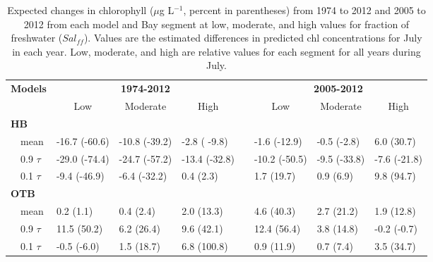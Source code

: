 \documentclass{svjour3}\usepackage[]{graphicx}\usepackage[]{color}
\newcommand{\mugl}{$\mu$g L$^{-1}$}
\begin{document}
%
\begin{table}[!tbp]
\caption{Expected changes in chlorophyll (\mugl, percent in parentheses) from 1974 to 2012 and 2005 to 2012 from each model and Bay segment at low, moderate, and high values for fraction of freshwater ($Sal_{ff}$).  Values are the estimated differences in predicted \ac{chl} concentrations for July in each year.  Low, moderate, and high are relative values for each segment for all years during July.\label{tab:trendest}} 
\begin{center}
\begin{tabular}{llllclll}
\hline\hline
\multicolumn{1}{l}{\bfseries {\bf Models}}&\multicolumn{3}{c}{\bfseries 1974-2012}&\multicolumn{1}{c}{\bfseries }&\multicolumn{3}{c}{\bfseries 2005-2012}\tabularnewline
\cline{2-4} \cline{6-8}
\multicolumn{1}{l}{}&\multicolumn{1}{c}{Low}&\multicolumn{1}{c}{Moderate}&\multicolumn{1}{c}{High}&\multicolumn{1}{c}{}&\multicolumn{1}{c}{Low}&\multicolumn{1}{c}{Moderate}&\multicolumn{1}{c}{High}\tabularnewline
\hline
{\bfseries HB}&&&&&&&\tabularnewline
~~mean&-16.7 {\footnotesize (-60.6)}&-10.8 {\footnotesize (-39.2)}&-2.8 {\footnotesize ( -9.8)}&&-1.6 {\footnotesize (-12.9)}&-0.5 {\footnotesize (-2.8)}&6.0 {\footnotesize (30.7)}\tabularnewline
~~0.9 $\tau$&-29.0 {\footnotesize (-74.4)}&-24.7 {\footnotesize (-57.2)}&-13.4 {\footnotesize (-32.8)}&&-10.2 {\footnotesize (-50.5)}&-9.5 {\footnotesize (-33.8)}&-7.6 {\footnotesize (-21.8)}\tabularnewline
~~0.1 $\tau$&-9.4 {\footnotesize (-46.9)}&-6.4 {\footnotesize (-32.2)}&0.4 {\footnotesize (2.3)}&&1.7 {\footnotesize (19.7)}&0.9 {\footnotesize (6.9)}& 9.8 {\footnotesize (94.7)}\tabularnewline
\hline
{\bfseries OTB}&&&&&&&\tabularnewline
~~mean&0.2 {\footnotesize (1.1)}&0.4 {\footnotesize (2.4)}&2.0 {\footnotesize (13.3)}&&4.6 {\footnotesize (40.3)}&2.7 {\footnotesize (21.2)}&1.9 {\footnotesize (12.8)}\tabularnewline
~~0.9 $\tau$&11.5 {\footnotesize (50.2)}&6.2 {\footnotesize (26.4)}& 9.6 {\footnotesize (42.1)}&&12.4 {\footnotesize (56.4)}&3.8 {\footnotesize (14.8)}&-0.2 {\footnotesize (-0.7)}\tabularnewline
~~0.1 $\tau$&-0.5 {\footnotesize (-6.0)}&1.5 {\footnotesize (18.7)}&6.8 {\footnotesize (100.8)}&&0.9 {\footnotesize (11.9)}&0.7 {\footnotesize (7.4)}&3.5 {\footnotesize (34.7)}\tabularnewline

\end{tabular}
\end{center}
\end{table}
\end{document}
